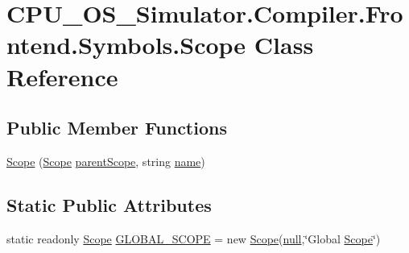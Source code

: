 \hypertarget{class_c_p_u___o_s___simulator_1_1_compiler_1_1_frontend_1_1_symbols_1_1_scope}{}\section{C\+P\+U\+\_\+\+O\+S\+\_\+\+Simulator.\+Compiler.\+Frontend.\+Symbols.\+Scope Class Reference}
\label{class_c_p_u___o_s___simulator_1_1_compiler_1_1_frontend_1_1_symbols_1_1_scope}
\subsection*{Public Member Functions}
\begin{DoxyCompactItemize}
\item 
\hyperlink{class_c_p_u___o_s___simulator_1_1_compiler_1_1_frontend_1_1_symbols_1_1_scope_ae8383693c3a694b25bd36c6223c1759c}{Scope} (\hyperlink{class_c_p_u___o_s___simulator_1_1_compiler_1_1_frontend_1_1_symbols_1_1_scope}{Scope} \hyperlink{class_c_p_u___o_s___simulator_1_1_compiler_1_1_frontend_1_1_symbols_1_1_scope_a537054d49f16d026d1200a3e54a0274e}{parent\+Scope}, string \hyperlink{class_c_p_u___o_s___simulator_1_1_compiler_1_1_frontend_1_1_symbols_1_1_scope_aae43a88c5f7b9933735cf177cbf413e0}{name})
\end{DoxyCompactItemize}
\subsection*{Static Public Attributes}
\begin{DoxyCompactItemize}
\item 
static readonly \hyperlink{class_c_p_u___o_s___simulator_1_1_compiler_1_1_frontend_1_1_symbols_1_1_scope}{Scope} \hyperlink{class_c_p_u___o_s___simulator_1_1_compiler_1_1_frontend_1_1_symbols_1_1_scope_a6083ac11708968b2d7cfc0720cf62648}{G\+L\+O\+B\+A\+L\+\_\+\+S\+C\+O\+P\+E} = new \hyperlink{class_c_p_u___o_s___simulator_1_1_compiler_1_1_frontend_1_1_symbols_1_1_scope}{Scope}(\hyperlink{_old_01_process_01_flags_8cs_afb8e110345c45e74478894341ab6b28e}{null},\char`\"{}Global \hyperlink{class_c_p_u___o_s___simulator_1_1_compiler_1_1_frontend_1_1_symbols_1_1_scope}{Scope}\char`\"{})
\end{DoxyCompactItemize}
